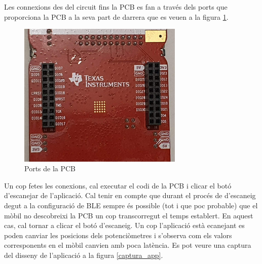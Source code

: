 Les connexions des del circuit fins la PCB es fan a través dels ports que proporciona la PCB a la seva part de darrera que es veuen a la figura \ref{ports_placa}.

\begin{figure}[h]
	\begin{center}
		\includegraphics[angle=90, width=0.7\textwidth]{./images/connexions_placa.jpg}
		\caption{Ports de la PCB}
		\label{ports_placa}
	\end{center}
\end{figure}

Un cop fetes les conexions, cal executar el codi de la PCB i clicar el botó d'escanejar de l'aplicació.
Cal tenir en compte que durant el procés de d'escaneig degut a la configuració de BLE sempre és possible (tot i que poc probable) que el mòbil no descobreixi la PCB un cop transcorregut el temps establert.
En aquest cas, cal tornar a clicar el botó d'escaneig.
Un cop l'aplicació està ecanejant es poden canviar les posicions dels potenciòmetres i s'observa com els valors corresponents en el mòbil canvien amb poca latència.
Es pot veure una captura del disseny de l'aplicació a la figura \ref{captura_app}.

